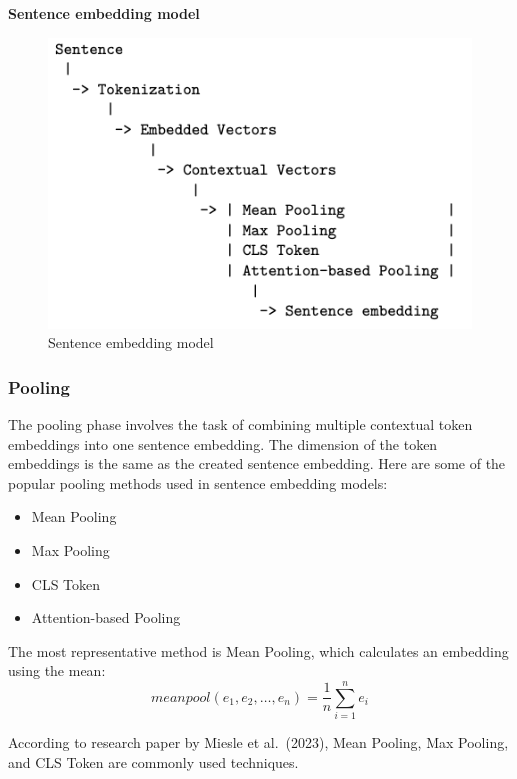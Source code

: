 \documentclass{wseas}
\begin{document}
\textbf{Sentence embedding model}

\begin{figure}[htbp]
  \centering
  \includegraphics[width=\linewidth]{resources/v1/sentenceEmbeddingModelCreation.png}
  \caption{Sentence embedding model}
  \label{fig:sentence_embedding_model_figure}
\end{figure}

\subsubsection{Pooling}

The pooling phase involves the task of combining multiple contextual
token embeddings into one sentence embedding. The dimension of the token
embeddings is the same as the created sentence embedding. Here are some
of the popular pooling methods used in sentence embedding models:

\begin{itemize}

\item
  Mean Pooling
\item
  Max Pooling
\item
  CLS Token
\item
  Attention-based Pooling
\end{itemize}

The most representative method is Mean Pooling, which calculates an
embedding using the mean:
\begin{equation}
  meanpool(e_1, e_2, \ldots, e_n) = \frac{1}{n} \sum_{i=1}^{n} e_i
\end{equation}

According to research paper \cite{cite5} by Miesle et al.~(2023), Mean
Pooling, Max Pooling, and CLS Token are commonly used techniques.
\end{document}
